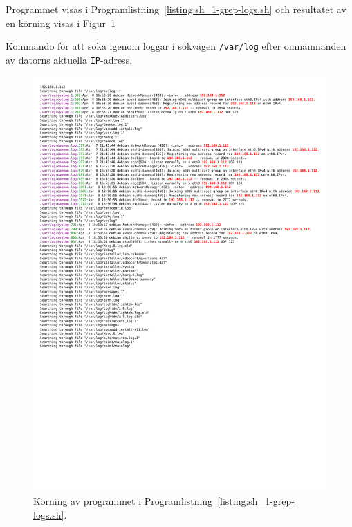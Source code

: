Programmet visas i Programlistning~\ref{listing:sh_1-grep-logs.sh} och
resultatet av en körning visas i
Figur~\ref{fig:sh_1-grep-logs.sh_output}

\begin{listing}[H]
  \caption{Kommando för att söka igenom loggar i sökvägen \texttt{/var/log}
           efter omnämnanden av datorns aktuella \texttt{IP}-adress.}
  \label{listing:sh_1-grep-logs.sh}
\end{listing}

\begin{figure}[htp]
  \centering
  \includegraphics[scale=0.85]{include/sh_1-grep-logs-sh_output.pdf}
  \caption{Körning av programmet i
           Programlistning~\ref{listing:sh_1-grep-logs.sh}.}
  \label{fig:sh_1-grep-logs.sh_output}
\end{figure}

